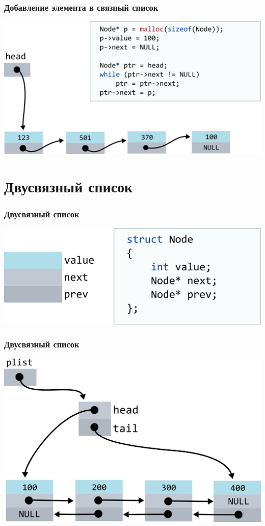 \documentclass[10pt,pdf,hyperref={unicode}]{beamer}
\begin{document}
\begin{frame}[fragile]
\frametitle{Добавление элемента в связный список}
\begin{center}
\includegraphics[scale=0.6]{images/list/codelistf_insert12.png}
\end{center}
\end{frame}


\section{Двусвязный список}

\begin{frame}[fragile]
\frametitle{Двусвязный список}
\begin{center}
\includegraphics[scale=0.6]{images/list/doublylist_definition.png}
\end{center}
\end{frame}

\begin{frame}[fragile]
\frametitle{Двусвязный список}
\begin{center}
\includegraphics[scale=0.6]{images/list/doublylist_overview.png}
\end{center}
\end{frame}
\end{document}
